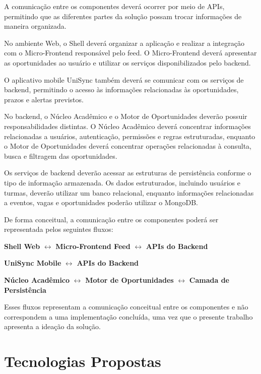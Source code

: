 \documentclass[12pt,oneside,a4paper,chapter=TITLE]{abntex2}
\begin{document}
A comunicação entre os componentes deverá ocorrer por meio de APIs,
permitindo que as diferentes partes da solução possam trocar
informações de maneira organizada.

No ambiente Web, o Shell deverá organizar a aplicação e realizar a
integração com o Micro-Frontend responsável pelo feed. O
Micro-Frontend deverá apresentar as oportunidades ao usuário e utilizar
os serviços disponibilizados pelo backend.

O aplicativo mobile UniSync também deverá se comunicar com os serviços
de backend, permitindo o acesso às informações relacionadas às
oportunidades, prazos e alertas previstos.

No backend, o Núcleo Acadêmico e o Motor de Oportunidades deverão
possuir responsabilidades distintas. O Núcleo Acadêmico deverá
concentrar informações relacionadas a usuários, autenticação,
permissões e regras estruturadas, enquanto o Motor de Oportunidades
deverá concentrar operações relacionadas à consulta, busca e filtragem
das oportunidades.

Os serviços de backend deverão acessar as estruturas de persistência
conforme o tipo de informação armazenada. Os dados estruturados,
incluindo usuários e turmas, deverão utilizar um banco relacional,
enquanto informações relacionadas a eventos, vagas e oportunidades
poderão utilizar o MongoDB.

De forma conceitual, a comunicação entre os componentes poderá ser
representada pelos seguintes fluxos:

\begin{center}
\textbf{Shell Web}
$\leftrightarrow$
\textbf{Micro-Frontend Feed}
$\leftrightarrow$
\textbf{APIs do Backend}
\end{center}

\begin{center}
\textbf{UniSync Mobile}
$\leftrightarrow$
\textbf{APIs do Backend}
\end{center}

\begin{center}
\textbf{Núcleo Acadêmico}
$\leftrightarrow$
\textbf{Motor de Oportunidades}
$\leftrightarrow$
\textbf{Camada de Persistência}
\end{center}

Esses fluxos representam a comunicação conceitual entre os
componentes e não correspondem a uma implementação concluída, uma vez
que o presente trabalho apresenta a ideação da solução.

\chapter{Tecnologias Propostas}
\end{document}
